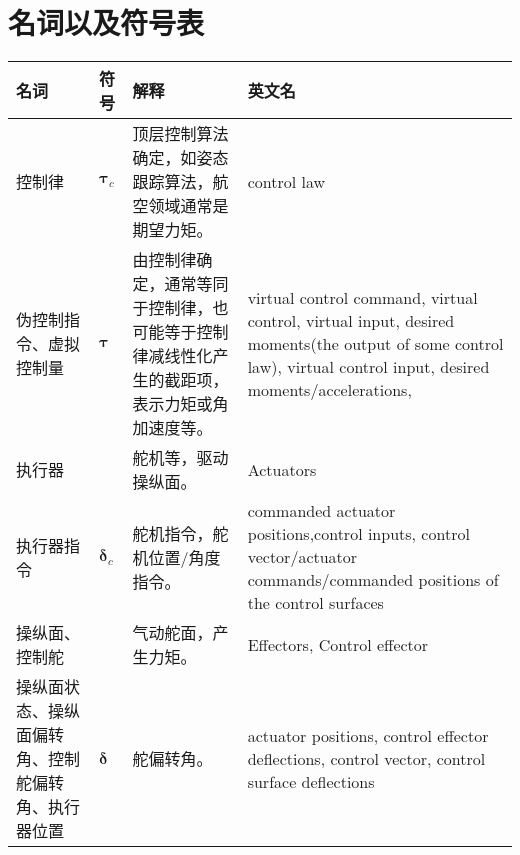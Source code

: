 \chapter*{名词以及符号表}
%
\begin{table}
	\caption{\label{DF_para}单涵道模型参数}
	\centering{}%
	\small 
\begin{longtable}{|>{\centering}m{2.5cm}|>{\centering}m{0.5cm}|>{\centering}m{5cm}|>{\centering}m{8cm}|}
	\hline 
	名词 				  &  符号 & 解释 & 英文名 \tabularnewline
	\hline 
	控制律 			 & $ \bm{\tau}_c $ & 顶层控制算法确定，如姿态跟踪算法，航空领域通常是期望力矩。 & control law \tabularnewline
	\hline 
	伪控制指令、虚拟控制量& $ \bm{\tau} $ & 由控制律确定，通常等同于控制律，也可能等于控制律减线性化产生的截距项，表示力矩或角加速度等。 & virtual control command\cite{Harkegard_2002}\cite{Harkegaard_2004}, virtual control\cite{Harkegard_2002}\cite{Johansen_2013}, virtual input\cite{Johansen_2013}, desired moments(the output of some control law)\cite{Durham_2017}, virtual control input\cite{Vermillion_2007}, desired moments/accelerations\cite{Luo_2004},   \tabularnewline
	\hline 
	执行器						&  & 舵机等，驱动操纵面。 & Actuators  \tabularnewline
	\hline 
	执行器指令		   & $ \bm{\delta}_c $ & 舵机指令，舵机位置/角度指令。 &  commanded actuator positions\cite{Harkegaard_2004},control
	inputs\cite{Harkegaard_2004}\cite{Johansen_2013}\cite{Vermillion_2007}\cite{Luo_2007}, control vector/actuator commands/commanded positions of the control surfaces\cite{Harkegard_2002} \tabularnewline
	\hline 
	操纵面、控制舵	      &  & 气动舵面，产生力矩。 & Effectors\cite{Johansen_2013}, Control effector\cite{Durham_2017}\cite{Luo_2004}  \tabularnewline
	\hline 
	操纵面状态、操纵面偏转角、控制舵偏转角、执行器位置& $ \bm{\delta} $ & 舵偏转角。 & actuator positions\cite{Harkegaard_2004}, control effector deflections\cite{Durham_2017}, control vector\cite{Durham_2017}, control surface deflections\cite{Luo_2007}  \tabularnewline
	\hline 
\end{longtable}
\end{table}